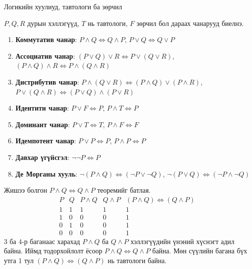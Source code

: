 \begin{frame}[allowframebreaks]{Логикийн хуулиуд, тавтологи ба зөрчил}
\begin{theorem} \label{Хэллэгийн холбоосын чанарууд} $P, Q, R$ дурын хэллэгүүд, $T$ нь тавтологи, $F$ зөрчил бол дараах чанарууд биелнэ.
  \begin{enumerate}
      \item \textbf{Коммутатив чанар}: $P\land Q\Leftrightarrow Q\land P$, $P\lor Q\Leftrightarrow Q\lor P$
      \item \textbf{Ассоциатив чанар}: $(P\lor Q)\lor R\Leftrightarrow P\lor(Q\lor R)$, $(P\land Q)\land R\Leftrightarrow P\land(Q\land R)$
      \item \textbf{Дистрибутив чанар}: $P\land(Q\lor R)\Leftrightarrow (P\land Q)\lor(P\land R)$, $P\lor(Q\land R)\Leftrightarrow (P\lor Q)\land(P\lor R)$
      \item \textbf{Идентити чанар}: $P\lor F\Leftrightarrow P$, $P\land T\Leftrightarrow P$
      \item \textbf{Доминант чанар}: $P\lor T\Leftrightarrow T$, $P\land F\Leftrightarrow F$
      \item \textbf{Идемпотент чанар}: $P\lor P\Leftrightarrow P$, $P\land P\Leftrightarrow P$
      \item \textbf{Давхар үгүйсгэл}: $\lnot\lnot P\Leftrightarrow P$
      \item \textbf{Де Морганы хууль}: $\lnot(P\land Q)\Leftrightarrow(\lnot P\lor\lnot Q)$, $\lnot(P\lor Q)\Leftrightarrow(\lnot P\land\lnot Q)$
  \end{enumerate}  
\end{theorem}
\begin{prof}
Жишээ болгон $P\land Q\Leftrightarrow Q\land P$ теоремийг батлая. 
    \[
\begin{array}{c|c|c|c|c}
P & Q & P\land Q & Q\land P & (P\land Q)\Leftrightarrow(Q\land P)\\\hline
1 & 1 & 1 & 1 & 1\\
1 & 0 & 0 & 0 & 1\\
0 & 1 & 0 & 0 & 1\\
0 & 0 & 0 & 0 & 1
\end{array}
\]
3 ба 4-р баганаас харахад $P\land Q$ ба $Q\land P$ хэллэгүүдийн үнэний хүснэгт адил байна. Иймд тодорхойлолт ёсоор $P\land Q\Leftrightarrow Q\land P$ байна. Мөн сүүлийн багана бүх утга 1 тул \((P\land Q)\Leftrightarrow(Q\land P)\) нь тавтологи байна. 
\end{prof}
\end{frame}

